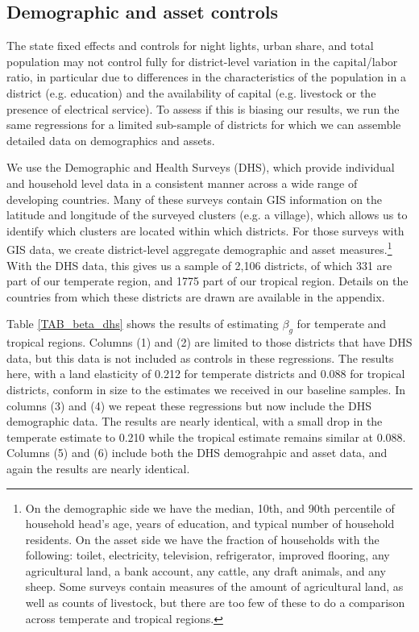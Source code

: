 \documentclass[11pt]{article}
\begin{document}
\subsection{Demographic and asset controls} 
The state fixed effects and controls for night lights, urban share, and total population may not control fully for district-level variation in the capital/labor ratio, in particular due to differences in the characteristics of the population in a district (e.g. education) and the availability of capital (e.g. livestock or the presence of electrical service). To assess if this is biasing our results, we run the same regressions for a limited sub-sample of districts for which we can assemble detailed data on demographics and assets.

We use the Demographic and Health Surveys (DHS), which provide individual and household level data in a consistent manner across a wide range of developing countries. Many of these surveys contain GIS information on the latitude and longitude of the surveyed clusters (e.g. a village), which allows us to identify which clusters are located within which districts. For those surveys with GIS data, we create district-level aggregate demographic and asset measures.\footnote{On the demographic side we have the median, 10th, and 90th percentile of household head's age, years of education, and typical number of household residents. On the asset side we have the fraction of households with the following: toilet, electricity, television, refrigerator, improved flooring, any agricultural land, a bank account, any cattle, any draft animals, and any sheep. Some surveys contain measures of the amount of agricultural land, as well as counts of livestock, but there are too few of these to do a comparison across temperate and tropical regions.} With the DHS data, this gives us a sample of 2,106 districts, of which 331 are part of our temperate region, and 1775 part of our tropical region. Details on the countries from which these districts are drawn are available in the appendix.

Table \ref{TAB_beta_dhs} shows the results of estimating $\beta_g$ for temperate and tropical regions. Columns (1) and (2) are limited to those districts that have DHS data, but this data is not included as controls in these regressions. The results here, with a land elasticity of 0.212 for temperate districts and 0.088 for tropical districts, conform in size to the estimates we received in our baseline samples. In columns (3) and (4) we repeat these regressions but now include the DHS demographic data. The results are nearly identical, with a small drop in the temperate estimate to 0.210 while the tropical estimate remains similar at 0.088. Columns (5) and (6) include both the DHS demograhpic and asset data, and again the results are nearly identical. 
\end{document}
